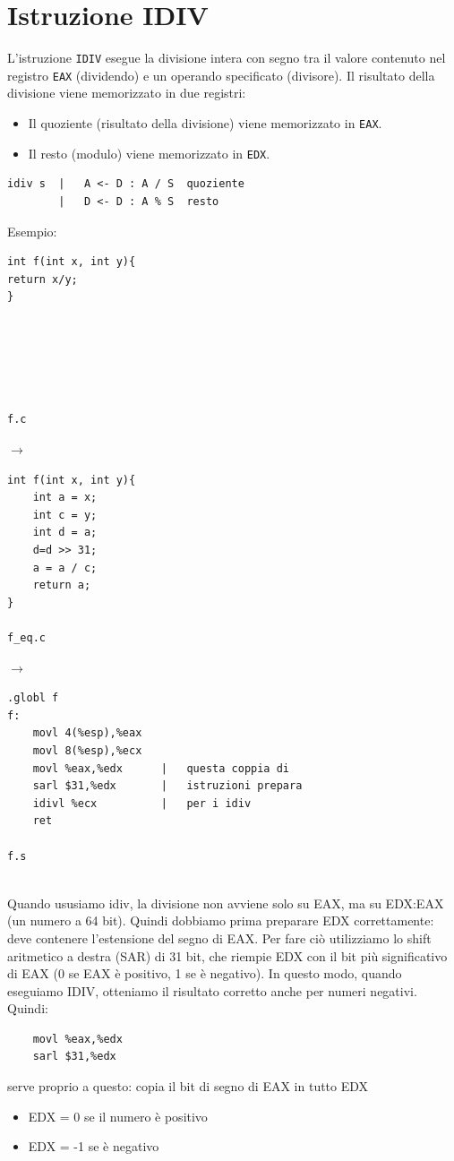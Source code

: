 \section{Istruzione IDIV}
\noindent L'istruzione \texttt{IDIV} esegue la divisione intera con segno 
tra il valore contenuto nel registro \texttt{EAX} (dividendo) e un operando 
specificato (divisore). Il risultato della divisione viene memorizzato in due registri:
\begin{itemize}
    \item Il quoziente (risultato della divisione) viene memorizzato in \texttt{EAX}.
    \item Il resto (modulo) viene memorizzato in \texttt{EDX}.
\end{itemize}
\begin{verbatim}
idiv s  |   A <- D : A / S  quoziente
        |   D <- D : A % S  resto
\end{verbatim}
Esempio:\\
\begin{minipage}{0.25\textwidth}
    \begin{verbatim}
int f(int x, int y){
return x/y;
}






f.c
    \end{verbatim}
\end{minipage}
\hfill
$\longrightarrow$
\hfill
\begin{minipage}{0.25\textwidth}
    \begin{verbatim}
int f(int x, int y){
    int a = x;
    int c = y;
    int d = a;
    d=d >> 31;
    a = a / c;
    return a;
}

f_eq.c
    \end{verbatim}
\end{minipage}
\hfill
$\longrightarrow$
\hfill
\begin{minipage}{0.4\textwidth}
    \begin{verbatim}
.globl f
f:
    movl 4(%esp),%eax
    movl 8(%esp),%ecx
    movl %eax,%edx      |   questa coppia di 
    sarl $31,%edx       |   istruzioni prepara 
    idivl %ecx          |   per i idiv
    ret

f.s
    \end{verbatim} 
\end{minipage}\medskip\\
Quando ususiamo idiv, la divisione non avviene solo su EAX, ma su EDX:EAX (un numero a 64 bit).
Quindi dobbiamo prima preparare EDX correttamente: deve contenere l’estensione del segno di EAX.
Per fare ciò utilizziamo lo shift aritmetico a destra (SAR) di 31 bit, che riempie EDX con il bit 
più significativo di EAX (0 se EAX è positivo, 1 se è negativo). In questo modo, quando eseguiamo IDIV, 
otteniamo il risultato corretto anche per numeri negativi. Quindi:
\begin{verbatim}
    movl %eax,%edx
    sarl $31,%edx
\end{verbatim}
serve proprio a questo: copia il bit di segno di EAX in tutto EDX
\begin{itemize}
    \item EDX = 0 se il numero è positivo
    \item EDX = -1 se è negativo
\end{itemize}
